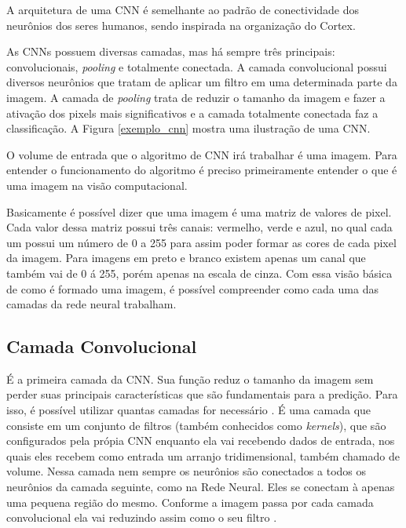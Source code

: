 A arquitetura de uma CNN é semelhante ao padrão de conectividade dos neurônios dos seres humanos, sendo inspirada na organização do Cortex. \cite{conv1}

 As CNNs possuem diversas camadas, mas há sempre três principais: convolucionais, \textit{pooling} e totalmente conectada. A camada convolucional possui diversos neurônios que tratam de aplicar um filtro em uma determinada parte da imagem. A camada de \textit{pooling} trata de reduzir o tamanho da imagem e fazer a ativação dos pixels mais significativos e a camada totalmente conectada faz a classificação. A Figura \ref{exemplo_cnn} mostra uma ilustração de uma CNN.

\begin{figure}[H]
	\centering
\end{figure}

O volume de entrada que o algoritmo de CNN irá trabalhar é uma imagem. Para entender o funcionamento do algoritmo é preciso primeiramente entender o que é uma imagem na visão computacional\cite{conv2}. 

Basicamente é possível dizer que uma imagem é uma matriz de valores de pixel. Cada valor dessa matriz possui três canais: vermelho, verde e azul, no qual cada um possui um número de 0 a 255 para assim poder formar as cores de cada pixel da imagem. Para imagens em preto e branco existem apenas um canal que também vai de 0 á 255, porém apenas na escala de cinza. 
Com essa visão básica de como é formado uma imagem, é possível compreender como cada uma das camadas da rede neural trabalham.

\subsection{Camada Convolucional}

É a primeira camada da CNN. Sua função reduz o tamanho da imagem sem perder suas principais características que são fundamentais para a predição. Para isso, é possível utilizar quantas camadas for necessário \cite{freecodecamp}. É uma camada que consiste em um conjunto de filtros (também conhecidos como \textit{kernels}), que são configurados pela própia CNN enquanto ela vai recebendo dados de entrada, nos quais eles recebem como entrada um arranjo tridimensional, também chamado de volume. Nessa camada nem sempre os neurônios são conectados a todos os neurônios da camada seguinte, como na Rede Neural. Eles se conectam à apenas uma pequena região do mesmo. Conforme a imagem passa por cada camada convolucional ela vai reduzindo assim como o seu filtro \cite{freecodecamp, conv2}.
 
